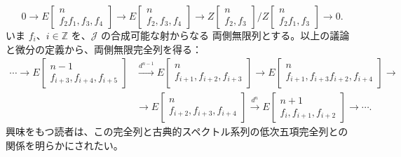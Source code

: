 \clearpage
{}%
\begingroup\small\setlength{\parskip}{0pt}\setlength{\emergencystretch}{2.5em}
\[
0\longrightarrow
E\!\begin{bmatrix}n\\ f_2f_1,f_3,f_4\end{bmatrix}
\longrightarrow
E\!\begin{bmatrix}n\\ f_2,f_3,f_4\end{bmatrix}
\longrightarrow
Z\!\begin{bmatrix}n\\ f_2,f_3\end{bmatrix}
 \Big/
Z\!\begin{bmatrix}n\\ f_2f_1,f_3\end{bmatrix}
\longrightarrow0.
\]
いま $f_i$、$i\in\mathbb Z$ を、$\mathcal J$ の合成可能な射からなる
両側無限列とする。以上の議論と微分の定義から、両側無限完全列を得る：
\[
\begin{aligned}
\cdots\longrightarrow
E\!\begin{bmatrix}n-1\\ f_{i+3},f_{i+4},f_{i+5}\end{bmatrix}
&\xrightarrow{d^{n-1}}
E\!\begin{bmatrix}n\\ f_{i+1},f_{i+2},f_{i+3}\end{bmatrix}
\longrightarrow
E\!\begin{bmatrix}n\\ f_{i+1},f_{i+3}f_{i+2},f_{i+4}\end{bmatrix}
\longrightarrow{}\\[-1pt]
&\longrightarrow
E\!\begin{bmatrix}n\\ f_{i+2},f_{i+3},f_{i+4}\end{bmatrix}
\xrightarrow{d^n}
E\!\begin{bmatrix}n+1\\ f_i,f_{i+1},f_{i+2}\end{bmatrix}
\longrightarrow\cdots.
\end{aligned}
\]
興味をもつ読者は、この完全列と古典的スペクトル系列の低次五項完全列との
関係を明らかにされたい。

